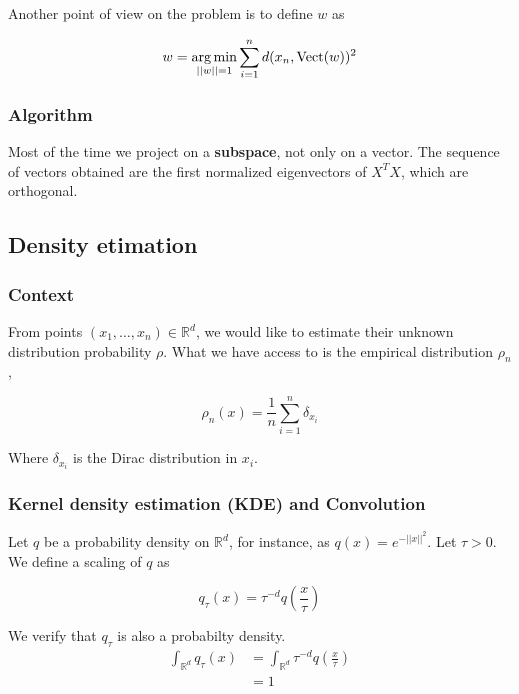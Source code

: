 \documentclass[
10pt, %
a4paper, %
oneside, %
headinclude,footinclude, %
BCOR5mm, %
]{scrartcl}
\begin{document}
Another point of view on the problem is to define $w$ as

\begin{equation*}
    w = \operatorname*{arg\,min}_{||w||=1} \sum^{n}_{i=1} d(x_n, \text{Vect}(w))^2
\end{equation*}

\subsubsection{\large\color{Periwinkle}Algorithm}

Most of the time we project on a \textbf{{subspace}}, not only on a vector. The sequence of vectors obtained are the first normalized eigenvectors of $X^TX$, which are orthogonal.

\subsection{\large\color{MidnightBlue}Density etimation}
\label{sec:density}

\subsubsection{\large\color{Periwinkle}Context}

From points $ (x_1, \dots, x_n)\in \mathbb{R}^d$, we would like to estimate their unknown distribution probability $\rho$. What we have access to is the empirical distribution $ \rho_n$, 

\begin{equation*}
    \rho_n(x) = \frac{1}{n} \sum^{n}_{i=1} \delta_{x_i}
\end{equation*}

Where $\delta_{x_i}$ is the Dirac distribution in $x_i$.

\subsubsection{\large\color{Periwinkle}Kernel density estimation (KDE) and Convolution}

Let $q$ be a probability density on $ \mathbb{R}^d$, for instance, as $q(x) = e^{-||x||^2}$. Let $\tau>0$. We define a scaling of $q$ as 

\begin{equation*}
    q_{\tau}(x) = \tau^{-d} q( \frac{x}{\tau} )
\end{equation*}

We verify that $q_{\tau}$ is also a probabilty density.
\begin{equation*}
    \begin{aligned}
	\int_{ \mathbb{R}^d} q_{\tau}(x)& =\int_{ \mathbb{R}^d} \tau^{-d} q( \frac{x}{\tau} )\\
	&= 1
    \end{aligned}
\end{equation*}
\end{document}
